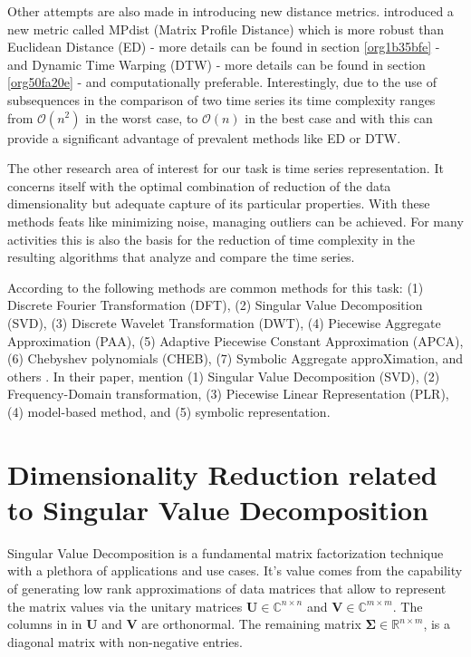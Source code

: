 \documentclass[phd,black, hidelinks]{PrincetonThesis}
\begin{document}
Other attempts are also made in introducing new distance metrics. \citeauthor{Gharghabi_2020} introduced a new metric called MPdist (Matrix Profile Distance) which is more robust than Euclidean Distance (ED) - more details can be found in section \ref{org1b35bfe} - and Dynamic Time Warping (DTW) - more details can be found in section \ref{org50fa20e} - and computationally preferable. Interestingly, due to the use of subsequences in the comparison of two time series its time complexity ranges from \(\mathcal{O}(n^2)\) in the worst case, to \(\mathcal{O}(n)\) in the best case and with this can provide a significant advantage of prevalent methods like ED or DTW.

The other research area of interest for our task is time series representation. It concerns itself with the optimal combination of reduction of the data dimensionality but adequate capture of its particular properties. With these methods feats like minimizing noise, managing outliers can be achieved. For many activities this is also the basis for the reduction of time complexity in the resulting algorithms that analyze and compare the time series.

According to \citeauthor{Li_2019} the following methods are common methods for this task: (1) Discrete Fourier Transformation (DFT), (2) Singular Value Decomposition (SVD), (3) Discrete Wavelet Transformation (DWT), (4) Piecewise Aggregate Approximation (PAA), (5) Adaptive Piecewise Constant Approximation (APCA), (6) Chebyshev polynomials (CHEB), (7) Symbolic Aggregate approXimation, and others \cite{Li_2019}. In their paper, \citeauthor{Pang_Liu_Peng_Peng_2018} mention (1) Singular Value Decomposition (SVD), (2) Frequency-Domain transformation, (3) Piecewise Linear Representation (PLR), (4) model-based method, and (5) symbolic representation.

\section{Dimensionality Reduction related to Singular Value Decomposition}
\label{sec:orge4891ed}
Singular Value Decomposition is a fundamental matrix factorization technique with a plethora of applications and use cases. It's value comes from the capability of generating low rank approximations of data matrices that allow to represent the matrix values via the unitary matrices \(\bm{U} \in \mathbb{C}^{n \times n}\) and \(\bm{V} \in \mathbb{C}^{m \times m}\). The columns in in \(\bm{U}\) and  \(\bm{V}\) are orthonormal. The remaining matrix \(\bm{\Sigma} \in \mathbb{R}^{n \times m}\), is a diagonal matrix with non-negative entries.
\end{document}
